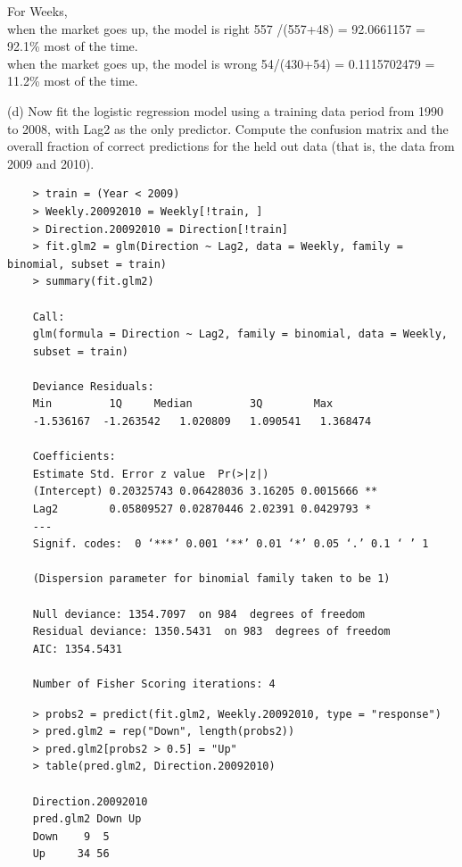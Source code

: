 \documentclass{article}
\begin{document}
For Weeks, \\
when the market goes up, the model is right 557 /(557+48) = 92.0661157 = 92.1\% most of the time. \\
when the market goes up, the model is wrong 54/(430+54) = 0.1115702479 = 11.2\% most of the time. \\
\newpage

(d) Now fit the logistic regression model using a training data period from 1990 to 2008, with Lag2 as the only predictor. Compute the confusion matrix and the overall fraction of correct predictions for the held out data (that is, the data from 2009 and 2010).

\begin{program}
	\begin{verbatim}
	> train = (Year < 2009)
	> Weekly.20092010 = Weekly[!train, ]
	> Direction.20092010 = Direction[!train]
	> fit.glm2 = glm(Direction ~ Lag2, data = Weekly, family = binomial, subset = train)
	> summary(fit.glm2)
	
	Call:
	glm(formula = Direction ~ Lag2, family = binomial, data = Weekly, 
	subset = train)
	
	Deviance Residuals: 
	Min         1Q     Median         3Q        Max  
	-1.536167  -1.263542   1.020809   1.090541   1.368474  
	
	Coefficients:
	Estimate Std. Error z value  Pr(>|z|)   
	(Intercept) 0.20325743 0.06428036 3.16205 0.0015666 **
	Lag2        0.05809527 0.02870446 2.02391 0.0429793 * 
	---
	Signif. codes:  0 ‘***’ 0.001 ‘**’ 0.01 ‘*’ 0.05 ‘.’ 0.1 ‘ ’ 1
	
	(Dispersion parameter for binomial family taken to be 1)
	
	Null deviance: 1354.7097  on 984  degrees of freedom
	Residual deviance: 1350.5431  on 983  degrees of freedom
	AIC: 1354.5431
	
	Number of Fisher Scoring iterations: 4
	\end{verbatim}
\end{program}

\begin{program}
	\begin{verbatim}
	> probs2 = predict(fit.glm2, Weekly.20092010, type = "response")
	> pred.glm2 = rep("Down", length(probs2))
	> pred.glm2[probs2 > 0.5] = "Up"
	> table(pred.glm2, Direction.20092010)
	
	Direction.20092010
	pred.glm2 Down Up
	Down    9  5
	Up     34 56
	\end{verbatim}
\end{program}
\end{document}
